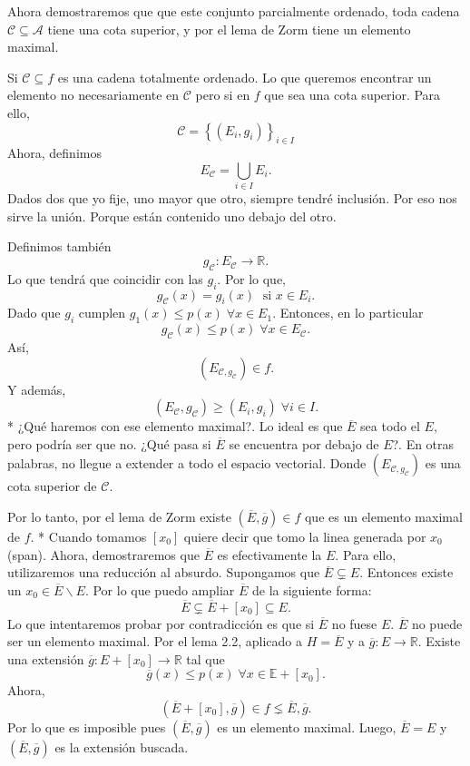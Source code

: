\begin{paracol}{2}
\begin{teo}
	Ahora demostraremos que que este conjunto parcialmente ordenado, toda cadena $\mathscr{C}\subseteq \mathscr{A}$ tiene una cota superior, y por el lema de Zorm tiene un elemento maximal.

	Si $\mathscr{C}\subseteq f$ es una cadena totalmente ordenado. Lo que queremos encontrar un elemento no necesariamente en $\mathscr{C}$ pero si en $f$ que sea una cota superior. Para ello,
	$$\mathscr{C}=\left\{\left(E_i,g_i\right)\right\}_{i\in I}$$
	Ahora, definimos 
	$$E_{\mathscr{C}}=\bigcup_{i\in I} E_i.$$
	Dados dos que yo fije, uno mayor que otro, siempre tendré inclusión. Por eso nos sirve la unión. Porque están contenido uno debajo del otro.

	Definimos también 
	$$g_{\mathscr{C}}:E_{\mathscr{C}}\to \mathbb{R}.$$
	Lo que tendrá que coincidir con las $g_i$. Por lo que,
	$$g_{\mathscr{C}}(x)=g_i(x)\; \text{ si } x\in E_i.$$
	Dado que $g_i$ cumplen  $g_1(x)\leq p(x)\; \forall x\in E_1$. Entonces, en lo particular 
	$$g_{\mathscr{C}}(x)\leq p(x)\; \forall x\in E_{\mathscr{C}}.$$
	Así,
	$$\left(E_{\mathscr{C},g_{\mathscr{C}}}\right)\in f.$$
	Y además,
	$$\left(E_{\mathscr{C}},g_{\mathscr{C}}\right)\geq \left(E_i,g_i\right)\; \forall i\in I.$$
\switchcolumn[1]*{\noindent\scriptsize
	¿Qué haremos con ese elemento maximal?. Lo ideal es que $\overline{E}$ sea todo el $E$, pero podría ser que no. ¿Qué pasa si $\overline{E}$ se encuentra por debajo de $E$?. En otras palabras, no llegue a extender a todo el espacio vectorial.
}
\switchcolumn[0]
	Donde $\left(E_{\mathscr{C},g_{\mathscr{C}}}\right)$ es una cota superior de $\mathscr{C}.$

	Por lo tanto, por el lema de Zorm existe $\left(\overline{E},\overline{g}\right)\in f$ que es un elemento maximal de $f$.
\switchcolumn[1]*{\noindent\scriptsize
    Cuando tomamos $[x_0]$ quiere decir que tomo la linea generada por $x_0$ (span).
} 
\switchcolumn[0]
	Ahora, demostraremos que $\overline{E}$ es efectivamente la $E$. Para ello, utilizaremos una reducción al absurdo. Supongamos que $\overline{E}\subsetneq E$. Entonces existe un $x_0\in \overline{E} \backslash E$. Por lo que puedo ampliar $\overline{E}$ de la siguiente forma:
	$$\overline{E} \subsetneq \overline{E}+[x_0]\subseteq E.$$
	Lo que intentaremos probar por contradicción es que si $\overline{E}$ no fuese $E$. $\overline{E}$ no puede ser un elemento maximal. Por el lema 2.2, aplicado a $H=\overline{E}$ y a $\overline{g}:E\to \mathbb{R}$. Existe una extensión $\overline{g}:E+[x_0]\to \mathbb{R}$ tal que 
	$$\overline{g}(x)\leq p(x)\; \forall x\in \mathbb{E}+[x_0].$$
	Ahora, $$\left(\overline{E}+[x_0],\overline{g}\right)\in f\lneq \overline{E},\overline{g}.$$ 
	Por lo que es imposible pues $\left(\overline{E},\overline{g}\right)$ es un elemento maximal. Luego, $\overline{E}=E$  y $\left(\overline{E},\overline{g}\right)$ es la extensión buscada.
\end{teo}


\end{paracol}

